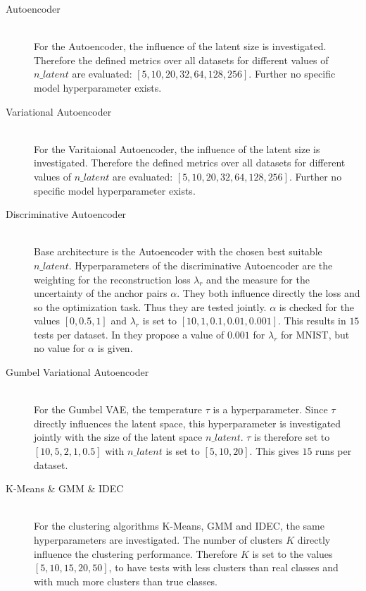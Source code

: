 \documentclass[12pt,DIV14,BCOR12mm,a4paper,footexclude,headinclude,halfparskip-,twoside,openright,openany,cleardoubleempty,idxtotoc,bibtotoc]{scrreprt} %
\numberwithin{equation}{chapter}
\begin{document}
\begin{description}
	\item[Autoencoder]\hfill \\
	For the Autoencoder, the influence of the latent size is investigated. Therefore the defined metrics over all datasets for different values of $n\_latent$ are evaluated: $[5, 10, 20, 32, 64, 128, 256]$. Further no specific model hyperparameter exists.
	\item[Variational Autoencoder]\hfill \\
	For the Varitaional Autoencoder, the influence of the latent size is investigated. Therefore the defined metrics over all datasets for different values of $n\_latent$ are evaluated: $[5, 10, 20, 32, 64, 128, 256]$. Further no specific model hyperparameter exists.
	\item[Discriminative Autoencoder]\hfill \\
	Base architecture is the Autoencoder with the chosen best suitable $n\_latent$. Hyperparameters of the discriminative Autoencoder are the weighting for the reconstruction loss $\lambda_r$ and the measure for the uncertainty of the anchor pairs $\alpha$. They both influence directly the loss and so the optimization task. Thus they are tested jointly. $\alpha$ is checked for the values $[0, 0.5, 1]$ and $\lambda_r$ is set to $[10, 1, 0.1, 0.01, 0.001]$. This results in $15$ tests per dataset. In \cite{DiscriminativeClustering} they propose a value of $0.001$ for $\lambda_r$ for MNIST, but no value for $\alpha$ is given.
	\item[Gumbel Variational Autoencoder]\hfill \\
	For the Gumbel VAE, the temperature $\tau$ is a hyperparameter. Since $\tau$ directly influences the latent space, this hyperparameter is investigated jointly with the size of the latent space $n\_latent$. $\tau$ is therefore set to $[10, 5, 2, 1, 0.5]$ with $n\_latent$ is set to $[5, 10, 20]$. This gives $15$ runs per dataset.
	\item[K-Means \& GMM \& IDEC]\hfill \\
	For the clustering algorithms K-Means, GMM and IDEC, the same hyperparameters are investigated. The number of clusters $K$ directly influence the clustering performance. Therefore $K$ is set to the values $[5, 10, 15, 20, 50]$, to have tests with less clusters than real classes and with much more clusters than true classes.
\end{description}
\end{document}
